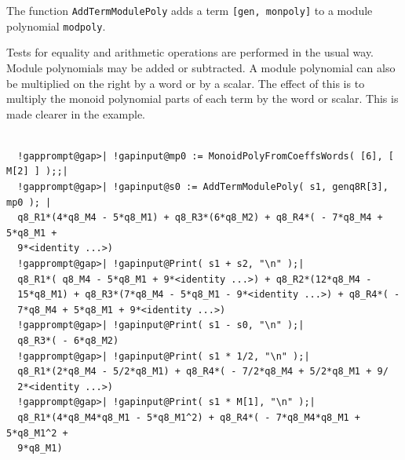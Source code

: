 \documentclass[a4paper,11pt]{report}
\begin{document}
{{{ The function \texttt{AddTermModulePoly} adds a term \texttt{[gen, monpoly]} to a module polynomial \texttt{modpoly}. 

 Tests for equality and arithmetic operations are performed in the usual way.
Module polynomials may be added or subtracted. A module polynomial can also be
multiplied on the right by a word or by a scalar. The effect of this is to
multiply the monoid polynomial parts of each term by the word or scalar. This
is made clearer in the example. 

 }

 
\begin{Verbatim}[commandchars=!@|,fontsize=\small,frame=single,label=Example]
  
  !gapprompt@gap>| !gapinput@mp0 := MonoidPolyFromCoeffsWords( [6], [ M[2] ] );;|
  !gapprompt@gap>| !gapinput@s0 := AddTermModulePoly( s1, genq8R[3], mp0 ); |
  q8_R1*(4*q8_M4 - 5*q8_M1) + q8_R3*(6*q8_M2) + q8_R4*( - 7*q8_M4 + 5*q8_M1 + 
  9*<identity ...>)
  !gapprompt@gap>| !gapinput@Print( s1 + s2, "\n" );|
  q8_R1*( q8_M4 - 5*q8_M1 + 9*<identity ...>) + q8_R2*(12*q8_M4 - 
  15*q8_M1) + q8_R3*(7*q8_M4 - 5*q8_M1 - 9*<identity ...>) + q8_R4*( - 
  7*q8_M4 + 5*q8_M1 + 9*<identity ...>)
  !gapprompt@gap>| !gapinput@Print( s1 - s0, "\n" );|
  q8_R3*( - 6*q8_M2)
  !gapprompt@gap>| !gapinput@Print( s1 * 1/2, "\n" );|
  q8_R1*(2*q8_M4 - 5/2*q8_M1) + q8_R4*( - 7/2*q8_M4 + 5/2*q8_M1 + 9/
  2*<identity ...>)
  !gapprompt@gap>| !gapinput@Print( s1 * M[1], "\n" );|
  q8_R1*(4*q8_M4*q8_M1 - 5*q8_M1^2) + q8_R4*( - 7*q8_M4*q8_M1 + 5*q8_M1^2 + 
  9*q8_M1)
  
\end{Verbatim}
 }

 }

         
\end{document}
